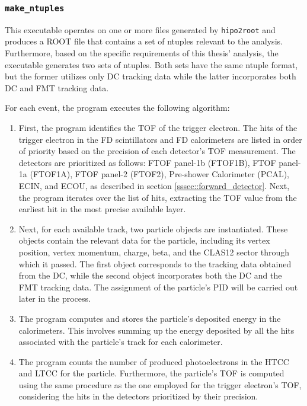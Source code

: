 \subsubsection{\texttt{make\_ntuples}}
\label{sssec::make_ntuples}
    This executable operates on one or more files generated by \texttt{hipo2root} and produces a ROOT file that contains a set of ntuples relevant to the analysis.
    Furthermore, based on the specific requirements of this thesis' analysis, the executable generates two sets of ntuples.
    Both sets have the same ntuple format, but the former utilizes only DC tracking data while the latter incorporates both DC and FMT tracking data.

    For each event, the program executes the following algorithm:

    \begin{enumerate}
        \item
            First, the program identifies the TOF of the trigger electron.
            The hits of the trigger electron in the FD scintillators and FD calorimeters are listed in order of priority based on the precision of each detector's TOF measurement.
            The detectors are prioritized as follows: FTOF panel-1b (FTOF1B), FTOF panel-1a (FTOF1A), FTOF panel-2 (FTOF2), Pre-shower Calorimeter (PCAL), ECIN, and ECOU, as described in section \ref{sssec::forward_detector}.
            Next, the program iterates over the list of hits, extracting the TOF value from the earliest hit in the most precise available layer.

        \item
            Next, for each available track, two particle objects are instantiated.
            These objects contain the relevant data for the particle, including its vertex position, vertex momentum, charge, beta, and the CLAS12 sector through which it passed.
            The first object corresponds to the tracking data obtained from the DC, while the second object incorporates both the DC and the FMT tracking data.
            The assignment of the particle's PID will be carried out later in the process.

        \item
            The program computes and stores the particle's deposited energy in the calorimeters.
            This involves summing up the energy deposited by all the hits associated with the particle's track for each calorimeter.

        \item
            The program counts the number of produced photoelectrons in the HTCC and LTCC for the particle.
            Furthermore, the particle's TOF is computed using the same procedure as the one employed for the trigger electron's TOF, considering the hits in the detectors prioritized by their precision.


\end{enumerate}
